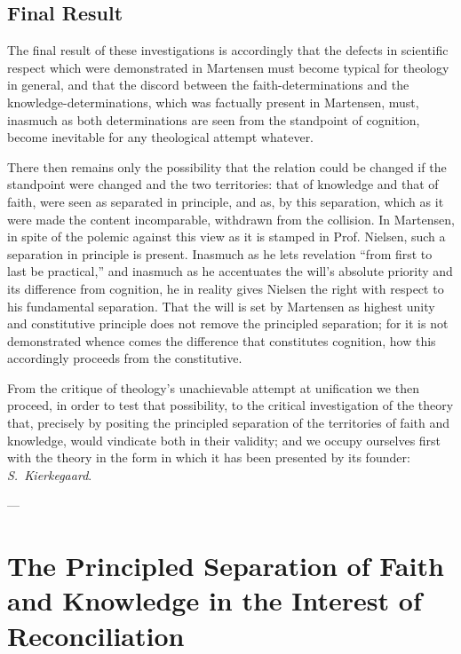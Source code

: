 \documentclass[12pt,a4paper]{book}
\begin{document}
\section{Final Result}
\label{sec:theology-result}

The final result of these investigations is accordingly that the defects in scientific
respect which were demonstrated in Martensen must become typical for theology in general,
and that the discord between the faith-determinations and the knowledge-determinations,
which was factually present in Martensen, must, inasmuch as both determinations are seen
from the standpoint of cognition, become inevitable for any theological attempt whatever.

There then remains only the possibility that the relation could be changed if the
standpoint were changed and the two territories: that of knowledge and that of faith, were
seen as separated in principle, and as, by this separation, which as it were made the
content incomparable, withdrawn from the collision. In Martensen, in spite of the polemic
against this view as it is stamped in Prof. Nielsen, such a separation in principle is
present. Inasmuch as he lets revelation ``from first to last be practical,'' and inasmuch as
he accentuates the will's absolute priority and its difference from cognition, he in reality
gives Nielsen the right with respect to his fundamental separation. That the will is set by
Martensen as highest unity and constitutive principle does not remove the principled
separation; for it is not demonstrated whence comes the difference that constitutes
cognition, how this accordingly proceeds from the constitutive.

From the critique of theology's unachievable attempt at unification we then proceed, in order
to test that possibility, to the critical investigation of the theory that, precisely by
positing the principled separation of the territories of faith and knowledge, would vindicate
both in their validity; and we occupy ourselves first with the theory in the form in which it
has been presented by its founder: \emph{S.\ Kierkegaard}.

\begin{center}---\end{center}


\chapter{The Principled Separation of Faith and Knowledge in the
  Interest of Reconciliation}
\label{ch:separation}
\end{document}
